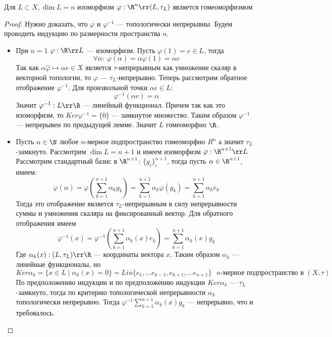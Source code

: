 \begin{claim}
	\label{claim:hom}
	Для $L \subset X, \dim L = n$ изоморфизм $\varphi: \R^n \rr (L, \tau_L)$ является гомеоморфизмом
\end{claim}
\begin{proof}
	Нужно доказать, что $\varphi$ и $\varphi^{-1}$ --- топологически непрерывны. Будем проводить индукцию по размерности пространства $n$. 
	\begin{itemize}
		\item При $n = 1$ $\varphi: \R \rr L$ --- изоморфизм. Пусть $\varphi(1) = e \in L$, тогда 
		$$
		\forall \alpha: \ \varphi(\alpha) = \alpha \varphi(1) = \alpha e
		$$
		Так как $\alpha \overbrace{\varphi}{\mapsto} \alpha e \in X$ является $\tau$-непрерывным как умножение скаляр в векторной топологии, то $\varphi$ --- $\tau_L$-непрерывно. Теперь рассмотрим обратное отображение $\varphi^{-1}$. Для произвольной точки $\alpha e \in L$:
		$$
		\varphi^{-1}(\alpha e) = \alpha 
		$$
		Значит $\varphi^{-1}: L \rr \R$ --- линейный функционал. Причем так как это изоморфизм, то $Ker \varphi^{-1} = \{0\}$ --- замкнутое множество. Таким образом $\varphi^{-1}$ --- непрерывен по предыдущей лемме. Значит $L$ гомеоморфно $\R$.
		\item Пусть $n \in \N$ любое $n$-мерное подпространство гомеоморфно $R^n$ а значит $\tau_L$-замкнуто. Рассмотрим $\dim L = n+1$ и имеем изоморфизм $\varphi: \R^{n+1} \rr L$ Рассмотрим стандартный базис в $\R^{n+1}$: $\{g_i\}_i^{n+1}$, тогда пусть $\alpha \in \R^{n+1}$, имеем:
		$$
		\varphi(\alpha) = \varphi\left(\sum_{k=1}^{n+1} \alpha_k g_k\right) = \sum_{k=1}^{n+1}\alpha_k \varphi(g_k) = \sum_{k=1}^{n+1} \alpha_k e_k
		$$
		Тогда это отображение является $\tau_L$-непрерывным в силу непрерывности суммы и умножения скаляра на фиксированный вектор.
		Для обратного отображения имеем 
		$$
		\varphi^{-1}(x) = \varphi^{-1} \left(\sum_{k=1}^{n+1}\alpha_k(x) e_k\right) = \sum_{k=1}^{n+1}\alpha_k(x)g_k
		$$
		Где $\alpha_k(x): (L, \tau_L) \rr \R$ --- координаты вектора $x$. Таким образом $\alpha_k$ --- линейные функционалы, но
		$$
		Ker \alpha_k = \{x \in L \mid \alpha_k(x) = 0\} = Lin\{e_1, \dots e_{k-1}, e_{k+1}, \dots e_{n+1}\} \text{ $n$-мерное подпространство в $(X, \tau)$}
		$$
		По предположению индукции и по предположению индукции $Ker \alpha_k$ --- $\tau_L$-замкнуто, тогда по критерию топологической непрерывности $\alpha_k$ топологически непрерывно. Тогда $\varphi^{-1} \sum_{k=1}^{n+1}\alpha_k(x)g_k$ --- непрерывно, что и требовалось.
	\end{itemize}
\end{proof}
